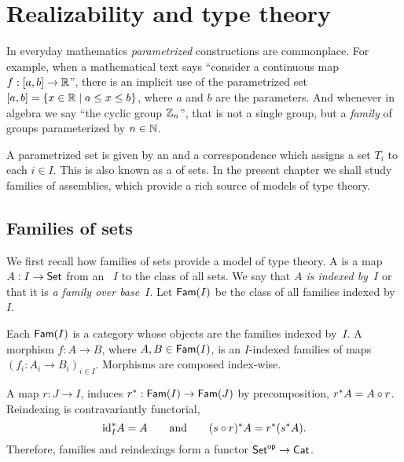 \chapter{Realizability and type theory}
\label{cha:type-theory-real}

In everyday mathematics \emph{parametrized} constructions are commonplace. For
example, when a mathematical text says ``consider a continuous map $f
: [a,b] \to \RR$'', there is an
implicit use of the parametrized set $[a,b] = \set{x \in \RR \such a
  \leq x \leq b}$, where $a$ and $b$ are the parameters. 
And whenever in algebra we say ``the cyclic group $\ZZ_n$'', that is not a single group, but a \emph{family} of groups parameterized by $n \in \NN$.

A parametrized set is given by an 
and a correspondence which assigns a set $T_i$ to each $i \in I$. This
is also known as a  of sets. In the present chapter we shall study families of assemblies, which provide a rich source of models of type theory.

\section{Families of sets}
\label{sec:families-sets}

We first recall how families of sets provide a model of type theory. A  is a map $A : I \to \Set$ from an ~$I$ to the class of all sets. We say that \emph{$A$ is indexed by~$I$} or that it is \emph{a family over base~$I$}. Let $\Fam{I}$ be the class of all families indexed by~$I$.

Each $\Fam{I}$ is a category whose objects are the families indexed by~$I$. A morphism $f : A \to B$, where $A, B \in \Fam{I}$, is an $I$-indexed families of maps $(f_i : A_i \to B_i)_{i \in I}$. Morphisms are composed index-wise.

A map $r : J \to I$, induces  $\invim{r} : \Fam{I} \to \Fam{J}$ by precomposition, $\invim{r} A = A \circ r$. Reindexing is contravariantly functorial,
%
\begin{equation*}
  \invim{\id[I]} A  = A
  \qquad\text{and}\qquad
  \invim{(s \circ r)} A = \invim{r} (\invim{s} A).
\end{equation*}
%
Therefore, families and reindexings form a functor $\opcat{\Set} \to \Cat$.

